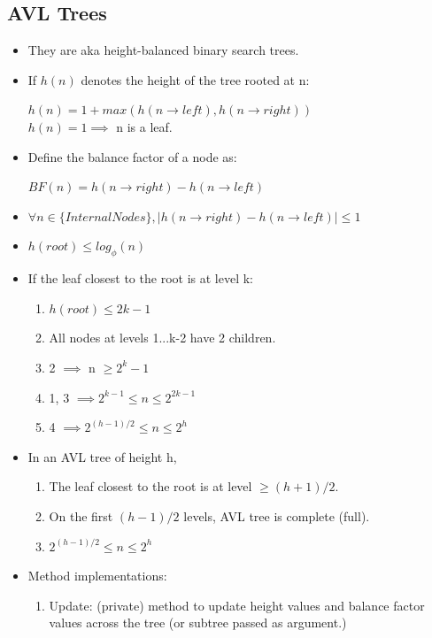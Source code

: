 \documentclass{report}
\begin{document}
\subsection{AVL Trees}
\begin{itemize}
\item They are aka height-balanced binary search trees.
\item If $h(n)$ denotes the height of the tree rooted at n:
\begin{center}
    $h(n) = 1+max(h(n\rightarrow left),h(n\rightarrow right))$\\
    $h(n) = 1 \implies $ n is a leaf.\\
\end{center}
\item Define the balance factor of a node as:
\begin{center}
    $BF(n) = h(n\rightarrow right) - h(n\rightarrow left)$
\end{center}
\item $\forall n \in \{Internal Nodes\}, |h(n\rightarrow right)-h(n\rightarrow left)| \le 1$
\item $h(root) \le log_{\phi}(n)$
\item If the leaf closest to the root is at level k:
\begin{enumerate}
    \item $h(root) \le 2k-1$
    \item All nodes at levels 1...k-2 have 2 children.
    \item 2 $\implies$ n $ \ge 2^k - 1 $
    \item 1, 3 $\implies 2^{k-1} \le n \le 2^{2k-1}$
    \item 4 $\implies 2^{(h-1)/2} \le n \le 2^{h}$
\end{enumerate}
\item In an AVL tree of height h,
\begin{enumerate}
    \item The leaf closest to the root is at level $\ge (h+1)/2$.
    \item On the first $(h-1)/2$ levels, AVL tree is complete (full).
    \item $ 2^{(h-1)/2}\le n \le 2^{h}$
\end{enumerate}
\item Method implementations:
\begin{enumerate}
\item Update: (private) method to update height values and balance factor values across the tree (or subtree passed as argument.)

\end{enumerate}
\end{itemize}
\end{document}
